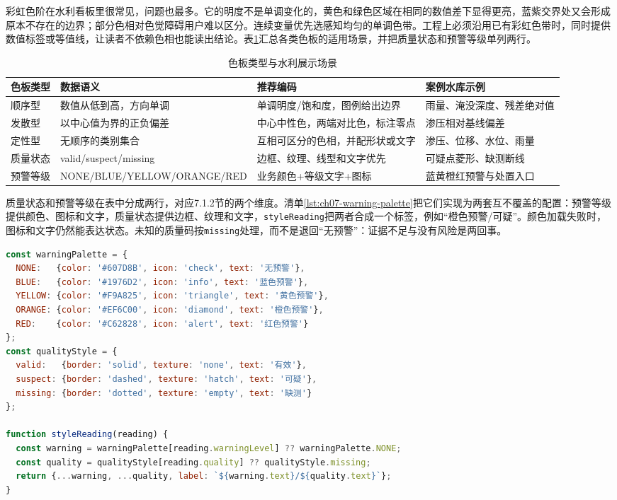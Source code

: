 彩虹色阶在水利看板里很常见，问题也最多。它的明度不是单调变化的，黄色和绿色区域在相同的数值差下显得更亮，蓝紫交界处又会形成原本不存在的边界；部分色相对色觉障碍用户难以区分。连续变量优先选感知均匀的单调色带。工程上必须沿用已有彩虹色带时，同时提供数值标签或等值线，让读者不依赖色相也能读出结论。表\ref{tab:ch7-color-palettes}汇总各类色板的适用场景，并把质量状态和预警等级单列两行。

\begin{table}[htbp]
\centering
\caption{色板类型与水利展示场景}
\label{tab:ch7-color-palettes}
\begin{tabular}{p{2.4cm}p{3.8cm}p{3.8cm}p{3.3cm}}
\toprule
色板类型 & 数据语义 & 推荐编码 & 案例水库示例 \\
\midrule
顺序型 & 数值从低到高，方向单调 & 单调明度/饱和度，图例给出边界 & 雨量、淹没深度、残差绝对值 \\
发散型 & 以中心值为界的正负偏差 & 中心中性色，两端对比色，标注零点 & 渗压相对基线偏差 \\
定性型 & 无顺序的类别集合 & 互相可区分的色相，并配形状或文字 & 渗压、位移、水位、雨量 \\
质量状态 & valid/\allowbreak suspect/\allowbreak missing & 边框、纹理、线型和文字优先 & 可疑点菱形、缺测断线 \\
预警等级 & NONE/\allowbreak BLUE/\allowbreak YELLOW/\allowbreak ORANGE/\allowbreak RED & 业务颜色+等级文字+图标 & 蓝黄橙红预警与处置入口 \\
\bottomrule
\end{tabular}
\end{table}

质量状态和预警等级在表中分成两行，对应7.1.2节的两个维度。清单\ref{lst:ch07-warning-palette}把它们实现为两套互不覆盖的配置：预警等级提供颜色、图标和文字，质量状态提供边框、纹理和文字，\texttt{styleReading}把两者合成一个标签，例如“橙色预警/可疑”。颜色加载失败时，图标和文字仍然能表达状态。未知的质量码按\texttt{missing}处理，而不是退回“无预警”：证据不足与没有风险是两回事。

\begin{lstlisting}[label={lst:ch07-warning-palette},language=JavaScript,breaklines=true,caption={预警等级与质量状态的双维度色彩配置}]
const warningPalette = {
  NONE:   {color: '#607D8B', icon: 'check', text: '无预警'},
  BLUE:   {color: '#1976D2', icon: 'info', text: '蓝色预警'},
  YELLOW: {color: '#F9A825', icon: 'triangle', text: '黄色预警'},
  ORANGE: {color: '#EF6C00', icon: 'diamond', text: '橙色预警'},
  RED:    {color: '#C62828', icon: 'alert', text: '红色预警'}
};
const qualityStyle = {
  valid:   {border: 'solid', texture: 'none', text: '有效'},
  suspect: {border: 'dashed', texture: 'hatch', text: '可疑'},
  missing: {border: 'dotted', texture: 'empty', text: '缺测'}
};

function styleReading(reading) {
  const warning = warningPalette[reading.warningLevel] ?? warningPalette.NONE;
  const quality = qualityStyle[reading.quality] ?? qualityStyle.missing;
  return {...warning, ...quality, label: `${warning.text}/${quality.text}`};
}
\end{lstlisting}

